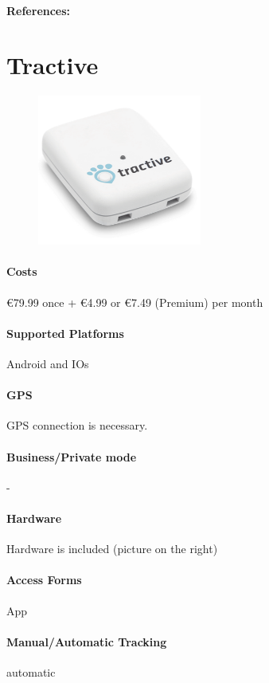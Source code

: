 \paragraph{References:} \cite{Maxtech}
\newpage

\section{Tractive}
\begin{figure}
  \begin{center}
    \includegraphics[width=0.48\textwidth]{bilder/tractive}
  \end{center}
\end{figure}
\paragraph{Costs}\euro 79.99 once + \euro 4.99 or \euro 7.49 (Premium) per month 
\paragraph{Supported Platforms}Android and IOs 
\paragraph{GPS} GPS connection is necessary.
\paragraph{Business/Private mode} -
\paragraph{Hardware}Hardware is included (picture on the right)
\paragraph{Access Forms}App
\paragraph{Manual/Automatic Tracking}automatic
